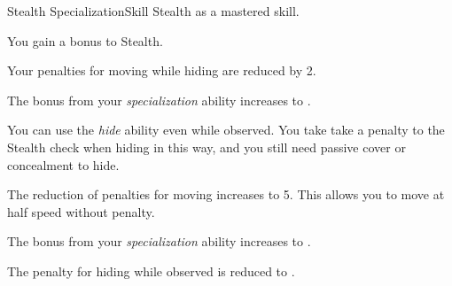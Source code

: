     \begin{feat}{Stealth Specialization}{Skill}
        \featpre Stealth as a mastered skill.

        \ff{}

         You gain a  bonus to Stealth.

         Your penalties for moving while hiding are reduced by 2. 

         The bonus from your \textit{specialization} ability increases to .

         You can use the \textit{hide} ability even while observed.
        You take take a  penalty to the Stealth check when hiding in this way, and you still need passive cover or concealment to hide.

         The reduction of penalties for moving increases to 5.
        This allows you to move at half speed without penalty.

         The bonus from your \textit{specialization} ability increases to .

         The penalty for hiding while observed is reduced to .
    \end{feat}

